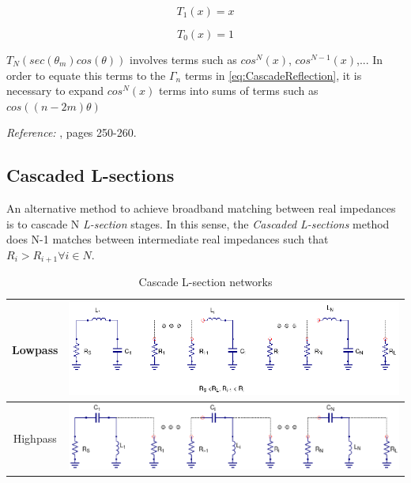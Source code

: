 \begin{equation}
T_1(x) = x
\end{equation}

\begin{equation}
T_0(x) = 1
\end{equation}

\noindent $T_N(sec(\theta_m)cos(\theta))$ involves terms such as $cos^N(x)$, $cos^{N-1}(x)$,... In order to equate this terms to the $\Gamma_n$ terms in \ref{eq:CascadeReflection}, it is necessary to expand $cos^N(x)$ terms into sums of terms such as $cos((n-2m)\theta)$

\noindent \textit{Reference:} \cite{Pozar}, pages 250-260.

\subsection{Cascaded L-sections}
An alternative method to achieve broadband matching between real impedances is to cascade N \textit{L-section} stages. In this sense, the \textit{Cascaded L-sections} method does N-1 matches between intermediate real impedances such that $R_i > R_{i+1} \forall i \in N$.

\begin{table}[H]
  \centering
  \begin{tabular}{ | c | c | }
    \hline
    Lowpass & \begin{minipage}{.4\textwidth}
      \includegraphics[width=\linewidth]{CascadedLCsch-lowpass}
    \end{minipage}\\ \hline
    Highpass
    &
    \begin{minipage}{.4\textwidth}
      \includegraphics[width=\linewidth]{CascadedLCsch-highpass}
    \end{minipage}
\\ \hline
  \end{tabular}
  \caption{Cascade L-section networks}
  \label{tbl:cascaded-l-section-lowpass-highpass-schematic}
\end{table}


